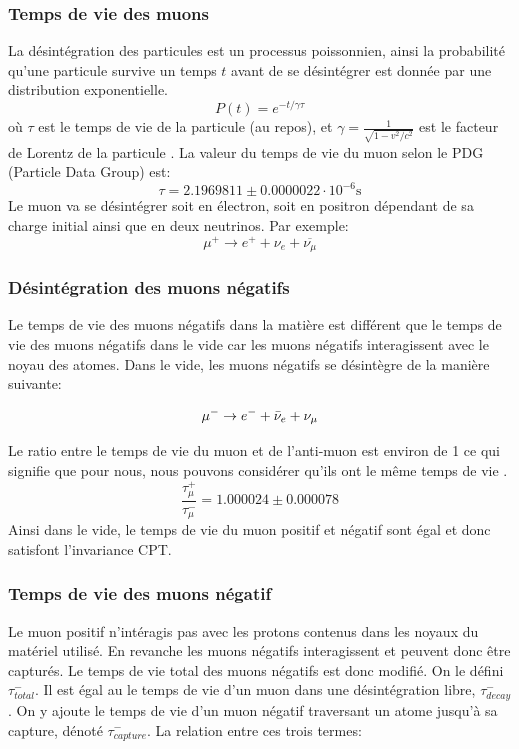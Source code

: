 \documentclass[12pt]{article}
\begin{document}
\subsubsection{Temps de vie des muons}
La désintégration des particules est un processus poissonnien, ainsi la probabilité qu'une particule survive un temps $t$ avant de se désintégrer est donnée par une distribution exponentielle.
\begin{equation}
P(t) = e^{-t/\gamma\tau}
\end{equation}
où $\tau$  est le temps de vie de la particule (au repos), et $\gamma = \frac{1}{\sqrt{1-v^2/c^2}}$ est le facteur de Lorentz de la particule \cite{noauthor_particle_2019}. La valeur du temps de vie du muon selon le PDG (Particle Data Group)\cite{PhysRevD.98.030001} est: \[\tau = 2.1969811\pm0.0000022\cdot10^{-6} \text{s}\]
Le muon va se désintégrer soit en électron, soit en positron dépendant de sa charge initial ainsi que en deux neutrinos. Par exemple:
\begin{equation}
\mu^{+}\to e^{+}+\nu_{e}+\overline{\nu_{\mu}}
\end{equation}


\subsubsection{Désintégration des muons négatifs}

Le temps de vie des muons négatifs dans la matière est différent que le temps de vie des muons négatifs dans le vide car les muons négatifs interagissent avec le noyau des atomes. Dans le vide, les muons négatifs se désintègre de la manière suivante: 

\[ \mu^{-} \rightarrow e^{-} + \Bar{\nu}_{e} + \nu_{\mu} \]

Le ratio entre le temps de vie du muon et de l'anti-muon est environ de 1 ce qui signifie que pour nous, nous pouvons considérer qu'ils ont le même temps de vie \cite{haxton_symmetries_1995}.
\[\frac{\tau^{+}_{\mu}}{\tau^{-}_{\mu}}=1.000024\pm0.000078\]
Ainsi dans le vide, le temps de vie du muon positif et négatif sont égal et donc satisfont l'invariance CPT.


\subsubsection{Temps de vie des muons négatif}

Le muon positif n'intéragis pas avec les protons contenus dans les noyaux du matériel utilisé. En revanche les muons négatifs interagissent et peuvent donc être capturés. Le temps de vie total des muons négatifs est donc modifié. On le défini $\tau_{total}^{-}$. Il est égal au le temps de vie d'un muon dans une désintégration libre, $\tau_{decay}^{-}$. On y ajoute le temps de vie d'un  muon négatif traversant un atome jusqu'à sa capture, dénoté  $\tau_{capture}^{-}$. La relation entre ces trois termes: 
\end{document}
